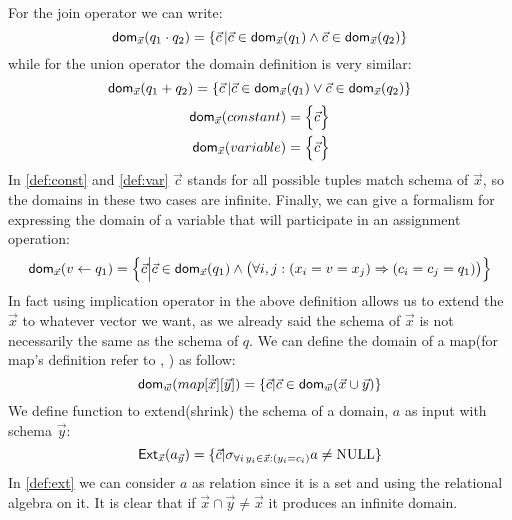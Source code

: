 \documentclass[12pt]{article}
\begin{document}
For the join operator we can write:
\begin{equation}
\label{def:join}
\text{\textsf{dom}{}}_{\vec{x}}(q_{1}\cdot q_{2})=\{\vec{c}\,|\vec{c}\in\text{\textsf{dom}{}}_{\vec{x}}(q_{1})\land\vec{c}\in\text{\textsf{dom}{}}_{\vec{x}}(q_{2})\}
\end{equation}
while for the union operator the domain definition is very similar:
\begin{equation}
\label{def:plus}
\text{\textsf{dom}{}}_{\vec{x}}(q_{1}+ q_{2})=\{\vec{c}\,|\vec{c}\in\text{\textsf{dom}{}}_{\vec{x}}(q_{1})\lor\vec{c}\in\text{\textsf{dom}{}}_{\vec{x}}(q_{2})\}
\end{equation}
\begin{eqnarray}
\textsf{dom}{}_{\vec x}(constant)=\Big\{\vec c\Big\}\label{def:const}\\
\textsf{dom}{}_{\vec x}(variable)=\Big\{\vec c\Big\}\label{def:var}
\end{eqnarray}
In \eqref{def:const} and \eqref{def:var}  $\vec{c}$ stands for all possible tuples match schema of $\vec{x}$, so the domains in these two cases are infinite. 
Finally, we can give a formalism for expressing the domain of a variable that will participate in an assignment operation:
\begin{equation}
\label{assign2}
\text{\textsf{dom}{}}_{\vec{x}}(v\gets q_{1})=\Big\{\vec{c}\Big|\vec{c}\in\text{\textsf{dom}{}}_{\vec{x}}(q_{1})\land \big(\forall i,j: (x_{i}=v=x_{j})\Rightarrow(c_{i}=c_{j}=q_{1})\big)\Big\}
\end{equation}
In fact using implication operator in the above definition allows us to extend the $\vec{x}$ to whatever vector we want, as we already said the schema of $\vec{x}$ is not necessarily the same as the schema of $q$. %
We can define the domain of a map(for map's definition refer to \cite{1}, \cite{2}) as follow:
\begin{equation}
\label{def:map}
\text{\textsf{dom}}_{\vec{w}}(map[\vec{x}][\vec{y}])=\{\vec{c}|\vec{c}\in\text{\textsf{dom}}_{\vec{w}}(\vec{x}\cup\vec{y})\}
\end{equation}
We define function \Ext{}  to extend(shrink) the schema of a domain, $a$ as input with schema $\vec{y}$:
\begin{equation}
\label{def:ext}
\text{\textsf{Ext}}_{\vec{x}}(a_{\vec{y}})=\{\vec{c}|\sigma_{\forall i\,y_{i}\in\vec{x}:(y_{i}=c_{i})}a\neq \text{NULL}\}
\end{equation}
In \eqref{def:ext} we can consider $a$ as relation since it is a set and using the relational algebra on it. 
It is clear that if $\vec{x}\cap\vec{y}\neq\vec{x}$ it produces an infinite domain. 
\end{document}
